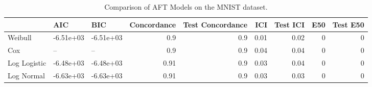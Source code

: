 \begin{table*}
\centering
\caption{Comparison of AFT Models on the MNIST dataset.}
\label{tab:mnist}
\begin{tabular}{lllrrrrrr}
\toprule
 & AIC & BIC & Concordance & Test Concordance & ICI & Test ICI & E50 & Test E50 \\
\midrule
Weibull & -6.51e+03 & -6.51e+03 & 0.9 & 0.9 & 0.01 & 0.02 & 0 & 0 \\
Cox & -- & -- & 0.9 & 0.9 & 0.04 & 0.04 & 0 & 0 \\
Log Logistic & -6.48e+03 & -6.48e+03 & 0.91 & 0.9 & 0.03 & 0.04 & 0 & 0 \\
Log Normal & -6.63e+03 & -6.63e+03 & 0.91 & 0.9 & 0.03 & 0.03 & 0 & 0 \\
\bottomrule
\end{tabular}
\end{table*}
